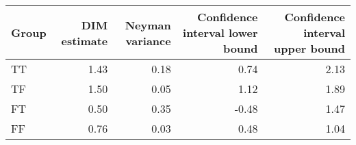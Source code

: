 \begin{tabular}{lrrrr}
  \hline
Group & DIM estimate & Neyman variance & Confidence interval lower bound & Confidence interval upper bound \\ 
  \hline
TT & 1.43 & 0.18 & 0.74 & 2.13 \\ 
  TF & 1.50 & 0.05 & 1.12 & 1.89 \\ 
  FT & 0.50 & 0.35 & -0.48 & 1.47 \\ 
  FF & 0.76 & 0.03 & 0.48 & 1.04 \\ 
   \hline
\end{tabular}
